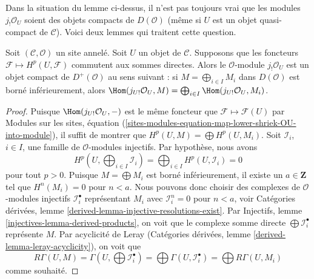 \noindent
Dans la situation du lemme ci-dessus, il n'est pas toujours vrai que les
modules $j_!\mathcal{O}_U$ soient des objets compacts de $D(\mathcal{O})$
(même si $U$ est un objet quasi-compact de $\mathcal{C}$). Voici deux lemmes
qui traitent cette question.


\begin{lemma}
\label{lemma-when-jshriek-lower-compact}
Soit $(\mathcal{C}, \mathcal{O})$ un site annelé. Soit $U$ un objet de
$\mathcal{C}$. Supposons que les foncteurs
$\mathcal{F} \mapsto H^p(U, \mathcal{F})$ commutent aux sommes directes. Alors
le $\mathcal{O}$-module $j_!\mathcal{O}_U$ est un objet compact de
$D^+(\mathcal{O})$ au sens suivant : si
$M = \bigoplus_{i \in I} M_i$ dans $D(\mathcal{O})$ est borné inférieurement,
alors $\Hom(j_{U!}\mathcal{O}_U, M) =
\bigoplus_{i \in I} \Hom(j_{U!}\mathcal{O}_U, M_i)$.
\end{lemma}

\begin{proof}
Puisque $\Hom(j_{U!}\mathcal{O}_U, -)$ est le même foncteur que
$\mathcal{F} \mapsto \mathcal{F}(U)$ par Modules sur les sites, équation
(\ref{sites-modules-equation-map-lower-shriek-OU-into-module}), il suffit de
montrer que $H^p(U, M) = \bigoplus H^p(U, M_i)$. Soit $\mathcal{I}_i$,
$i \in I$, une famille de $\mathcal{O}$-modules injectifs. Par hypothèse,
nous avons
$$
H^p(U, \bigoplus\nolimits_{i \in I} \mathcal{I}_i) =
\bigoplus\nolimits_{i \in I} H^p(U, \mathcal{I}_i) = 0
$$
pour tout $p > 0$. Puisque $M = \bigoplus M_i$ est borné inférieurement, il
existe un $a \in \mathbf{Z}$ tel que $H^n(M_i) = 0$ pour $n < a$. Nous
pouvons donc choisir des complexes de $\mathcal{O}$-modules injectifs
$\mathcal{I}_i^\bullet$ représentant $M_i$ avec $\mathcal{I}_i^n = 0$ pour
$n < a$, voir Catégories dérivées, lemme
\ref{derived-lemma-injective-resolutions-exist}. Par Injectifs, lemme
\ref{injectives-lemma-derived-products}, on voit que le complexe somme directe
$\bigoplus \mathcal{I}_i^\bullet$ représente $M$. Par acyclicité de Leray
(Catégories dérivées, lemme \ref{derived-lemma-leray-acyclicity}), on voit que
$$
R\Gamma(U, M) = \Gamma(U, \bigoplus \mathcal{I}_i^\bullet) =
\bigoplus \Gamma(U, \mathcal{I}_i^\bullet) =
\bigoplus R\Gamma(U, M_i)
$$
comme souhaité.
\end{proof}

